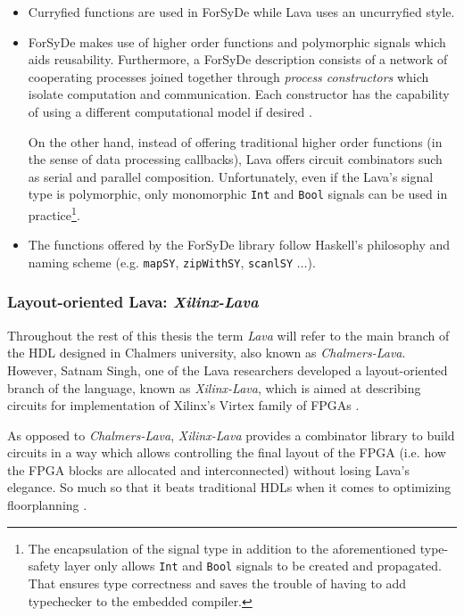 \begin{itemize}
  \item Curryfied functions are used in ForSyDe while Lava uses
    an uncurryfied style.

  \item ForSyDe makes use of higher order functions and polymorphic
    signals which aids reusability. Furthermore, a ForSyDe description
    consists of a network of cooperating processes joined together through
    \textit{process constructors} which isolate computation and
    communication. Each constructor has the capability of using a different
    computational model if desired  \cite{models}.

    On the other hand, instead of offering traditional higher order functions
    (in the sense of data processing callbacks), Lava offers circuit
    combinators such as serial and parallel composition.  Unfortunately, even
    if the Lava's signal type is polymorphic, only monomorphic \texttt{Int}
    and \texttt{Bool} signals can be used in practice\footnote{The
      encapsulation of the signal type in addition to the aforementioned
      type-safety layer only allows \texttt{Int} and \texttt{Bool} signals to
      be created and propagated. That ensures type correctness and saves the
      trouble of having to add typechecker to the embedded compiler.}.

  \item The functions offered by the ForSyDe library follow Haskell's
    philosophy and naming scheme (e.g. \texttt{mapSY}, \texttt{zipWithSY},
    \texttt{scanlSY} $\dots$).
\end{itemize}

\subsubsection{Layout-oriented Lava: \textit{Xilinx-Lava}}
Throughout the rest of this thesis the term \textit{Lava} will refer
to the main branch of the HDL designed in Chalmers university, also
known as \textit{Chalmers-Lava}. However, Satnam Singh, one of the
Lava researchers developed a layout-oriented branch of the language,
known as \textit{Xilinx-Lava}, which is aimed at describing circuits
for implementation of Xilinx's Virtex family of FPGAs \cite{fpga}.

As opposed to \textit{Chalmers-Lava}, \textit{Xilinx-Lava} provides a
combinator library to build circuits in a way which allows controlling the
final layout of the FPGA (i.e. how the FPGA blocks are allocated and
interconnected) without losing Lava's elegance. So much so that it beats
traditional HDLs when it comes to optimizing floorplanning \cite{sorter}.


